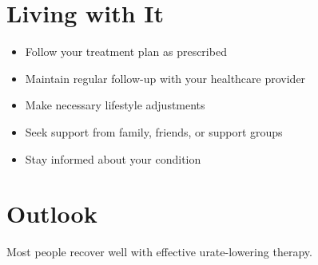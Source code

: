 \section{Living with It}
\begin{itemize}[noitemsep]
  \item Follow your treatment plan as prescribed
  \item Maintain regular follow-up with your healthcare provider
  \item Make necessary lifestyle adjustments
  \item Seek support from family, friends, or support groups
  \item Stay informed about your condition
\end{itemize}
\section{Outlook}
Most people recover well with effective urate-lowering therapy.
